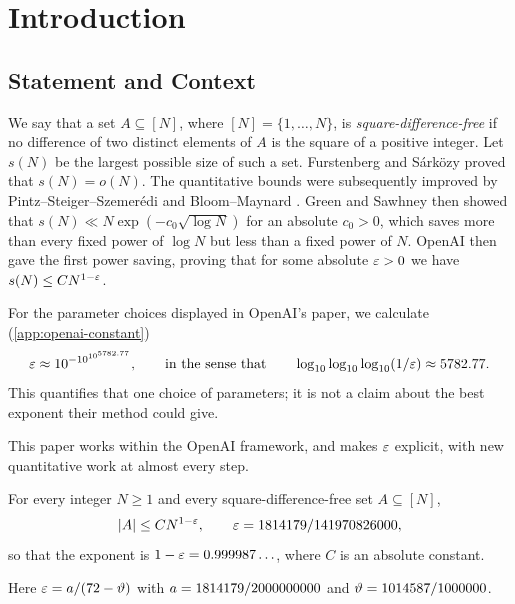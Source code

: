 \providecommand{\PushA}{\frac{5422587}{6103515625}}
\providecommand{\PushExponent}{\frac{5422587}{433349609375}}
\providecommand{\PushDecimal}{1.25131923109859\ldots\cdot10^{-5}}
\providecommand{\PushK}{890666}
\providecommand{\PushTheta}{0.99999999997327}
\section{Introduction}\label{sec:intro}

\subsection{Statement and Context}\label{subsec:intro:statement}

We say that a set $A\subseteq[N]$, where $[N]=\{1,\ldots,N\}$, is
\emph{square-difference-free} if no difference of two distinct elements of
$A$ is the square of a positive integer. Let $s(N)$ be the largest possible
size of such a set. Furstenberg \cite{Furstenberg77} and
S\'ark\"ozy \cite{Sarkozy78} proved that $s(N)=o(N)$. The quantitative
bounds were subsequently improved by Pintz--Steiger--Szemer\'edi
\cite{PSS88} and Bloom--Maynard \cite{BloomMaynard}. Green and Sawhney
\cite{GreenSawhney} then showed that
$s(N)\ll N\exp(-c_0\sqrt{\log N})$ for an absolute $c_0>0$, which
saves more than every fixed power of $\log N$ but less than a fixed
power of $N$. OpenAI \cite{OpenAI} then gave the first power saving,
proving that for some absolute $\varepsilon>0$ we have
$s(N)\le CN^{1-\varepsilon}$.

For the parameter choices displayed in OpenAI's paper, we calculate
(\cref{app:openai-constant})
\[
  \varepsilon\approx10^{-10^{10^{5782.77}}},\qquad\text{in the sense that}\qquad
  \log_{10}\log_{10}\log_{10}(1/\varepsilon)\approx5782.77.
\]
This quantifies that one choice of parameters; it is not a claim
about the best exponent their method could give.

This paper works within the OpenAI framework, and makes $\varepsilon$
explicit, with new quantitative work at almost every step.

\begin{theorem}\label{thm:main}
For every integer $N\ge1$ and every square-difference-free set
$A\subseteq[N]$,
\[
  |A|\le CN^{1-\varepsilon},\qquad
  \varepsilon=1814179/141970826000,
\]
so that the exponent is $1-\varepsilon=0.999987\ldots$, where $C$ is
an absolute constant.
\end{theorem}

Here $\varepsilon=a/(72-\vartheta)$ with $a=1814179/2000000000$ and
$\vartheta=1014587/1000000$.

